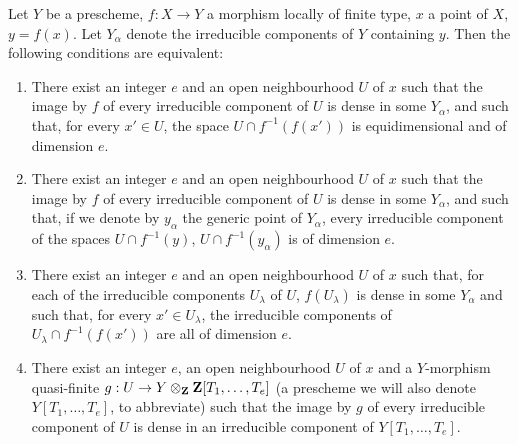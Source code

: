 \begin{proposition}[13.3.1]
\label{IV.13.3.1}
Let $Y$ be a prescheme, $f:X\to Y$ a morphism locally of finite type, $x$ a point of $X$, $y=f(x)$.
Let $Y_\alpha$ denote the irreducible components of $Y$ containing $y$.
Then the following conditions are equivalent:
\begin{enumerate}[label=\emph{\alph*)}]
  \item There exist an integer $e$ and an open neighbourhood $U$ of $x$ such that the image by $f$ of every irreducible component of $U$ is dense in some $Y_\alpha$, and such that, for every $x'\in U$, the space $U\cap f^{-1}(f(x'))$ is equidimensional and of dimension $e$.
  \item[\emph{a$'$)}] There exist an integer $e$ and an open neighbourhood $U$ of $x$ such that the image by $f$ of every irreducible component of $U$ is dense in some $Y_\alpha$, and such that, if we denote by $y_\alpha$ the generic point of $Y_\alpha$, every irreducible component of the spaces $U\cap f^{-1}(y)$, $U\cap f^{-1}(y_\alpha)$ is of dimension $e$.
  \item[\emph{a$''$)}] There exist an integer $e$ and an open neighbourhood $U$ of $x$ such that, for each of the irreducible components $U_\lambda$ of $U$, $f(U_\lambda)$ is dense in some $Y_\alpha$ and such that, for every $x'\in U_\lambda$, the irreducible components of $U_\lambda\cap f^{-1}(f(x'))$ are all of dimension $e$.
  \item There exist an integer $e$, an open neighbourhood $U$ of $x$ and a $Y$-morphism \textup{quasi-finite} $g:U\to Y\otimes_{\mathbf{Z}}\mathbf{Z}[T_1,\ldots,T_e]$ \textup{(a prescheme we will also denote $Y[T_1,\ldots,T_e]$, to abbreviate)} such that the image by $g$ of every irreducible component of $U$ is dense in an irreducible component of $Y[T_1,\ldots,T_e]$.
\end{enumerate}
\end{proposition}

